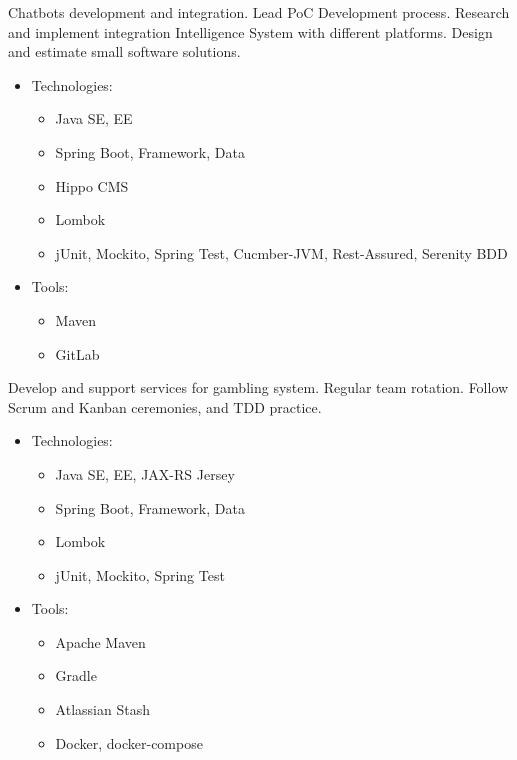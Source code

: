 \documentclass[11pt, a4paper]{moderncv}
\begin{document}
{
Chatbots development and integration. Lead PoC Development process. Research and implement integration Intelligence System with different platforms. Design and estimate small software solutions.
\begin{itemize}
\item Technologies:
\begin{itemize}
\item Java SE, EE
\item Spring Boot, Framework, Data
\item Hippo CMS
\item Lombok
\item jUnit, Mockito, Spring Test, Cucmber-JVM, Rest-Assured, Serenity BDD  
\end{itemize}
\item Tools:
\begin{itemize}
\item Maven
\item GitLab 
\end{itemize}
\end{itemize}
}

{Develop and support services for gambling system. Regular team rotation. Follow Scrum and Kanban ceremonies, and TDD practice. 
\begin{itemize}
\item Technologies:
\begin{itemize}
\item Java SE, EE, JAX-RS Jersey
\item Spring Boot, Framework, Data
\item Lombok 
\item jUnit, Mockito, Spring Test
\end{itemize}
\item Tools:
\begin{itemize}
\item Apache Maven
\item Gradle
\item Atlassian Stash
\item Docker, docker-compose
\end{itemize}
\end{itemize}}
\end{document}
